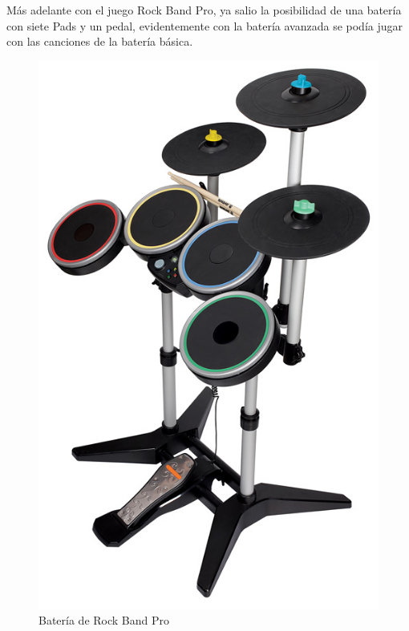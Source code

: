 \documentclass[a4paper,11pt,oneside]{book}
\begin{document}
Más adelante con el juego Rock Band Pro, ya salio la posibilidad de una batería con siete \gls{Pads} y un pedal, evidentemente con la batería avanzada se podía jugar con las canciones de la batería básica.

\begin{figure}[H]
\begin{center}
\includegraphics[scale=0.2]{Imagenes/rb3-drums.jpg}
\caption{Batería de Rock Band Pro}
\label{Batería de Rock Band Pro}
\end{center}
\end{figure}
\end{document}
